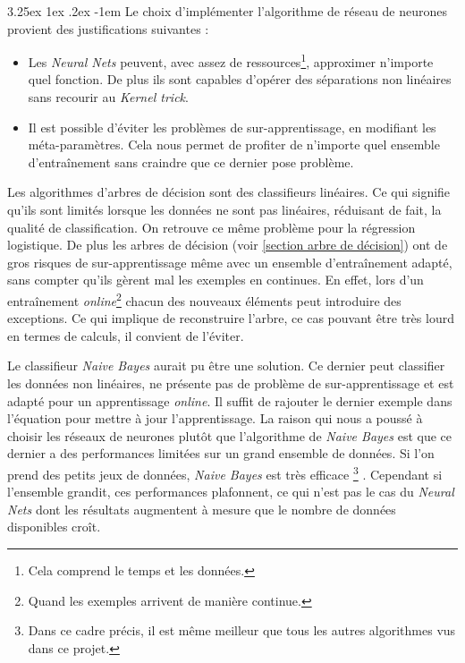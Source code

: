 \documentclass[a4paper, 11pt]{article}
\makeatletter
\renewcommand\paragraph{\@startsection{paragraph}{5}{\z@}%
  {3.25ex \@plus1ex \@minus.2ex}%
  {-1em}%
  {\normalfont\normalsize\bfseries}}
\makeatother
\begin{document}
\paragraph{}
Le choix d'implémenter l'algorithme de réseau de neurones provient des justifications suivantes :
\begin{itemize}
 \item Les \textit{Neural Nets} peuvent, avec assez de ressources\footnote{Cela comprend le temps et les données.}, approximer n'importe
 quel fonction. De plus ils sont capables d'opérer des séparations non linéaires sans recourir au \textit{Kernel trick}.
 \item Il est possible d'éviter les problèmes de sur-apprentissage, en modifiant les méta-paramètres. Cela nous permet de profiter
 de n'importe quel ensemble d'entraînement sans craindre que ce dernier pose problème.
\end{itemize}

Les algorithmes d'arbres de décision sont des classifieurs linéaires. Ce qui signifie qu'ils sont limités
lorsque les données ne sont pas linéaires, réduisant de fait, la qualité de classification. On retrouve ce même problème
pour la régression logistique. De plus les arbres de décision (voir \ref{section arbre de décision}) ont de gros risques
de sur-apprentissage même avec un ensemble d'entraînement adapté, sans compter qu'ils gèrent mal les exemples en continues.
En effet, lors d'un entraînement \textit{online}\footnote{Quand les exemples arrivent de manière continue.} chacun des nouveaux
éléments peut introduire des exceptions. Ce qui implique de reconstruire l'arbre, ce cas pouvant être très lourd en termes
de calculs, il convient de l'éviter.

Le classifieur \textit{Naive Bayes} aurait pu être une solution. Ce dernier peut classifier les données non linéaires,
ne présente pas de problème de sur-apprentissage et est adapté pour un apprentissage \textit{online}. Il suffit de rajouter le
dernier exemple dans l'équation pour mettre à jour l'apprentissage. La raison qui nous a poussé à choisir les réseaux de neurones 
plutôt que l'algorithme de \textit{Naive Bayes} est que ce dernier a des performances limitées sur un grand ensemble de données.
Si l'on prend des petits jeux de données, \textit{Naive Bayes} est très efficace
\footnote{Dans ce cadre précis, il est même meilleur que tous les autres algorithmes vus dans ce projet.}
\cite{ml_petites_donnees}.
Cependant si l'ensemble grandit, ces performances plafonnent, ce qui n'est pas le cas du \textit{Neural Nets} dont les
résultats augmentent à mesure que le nombre de données disponibles croît.
\end{document}
